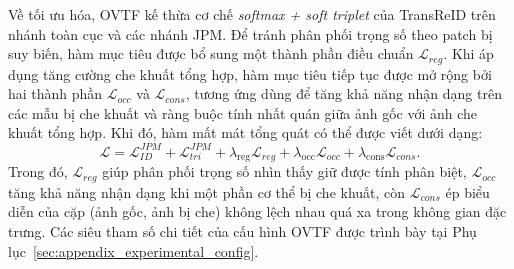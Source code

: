 Về tối ưu hóa, OVTF kế thừa cơ chế \textit{softmax + soft triplet} của
TransReID trên nhánh toàn cục và các nhánh JPM. Để tránh phân phối trọng số
theo patch bị suy biến, hàm mục tiêu được bổ sung một thành phần điều chuẩn
\(\mathcal{L}_{reg}\). Khi áp dụng tăng cường che khuất tổng hợp, hàm mục tiêu
tiếp tục được mở rộng bởi hai thành phần \(\mathcal{L}_{occ}\) và
\(\mathcal{L}_{cons}\), tương ứng dùng để tăng khả năng nhận dạng trên các mẫu
bị che khuất và ràng buộc tính nhất quán giữa ảnh gốc với ảnh che khuất tổng
hợp. Khi đó, hàm mất mát tổng quát có thể được viết dưới dạng:
\[
\mathcal{L}
= \mathcal{L}_{ID}^{JPM}
+ \mathcal{L}_{tri}^{JPM}
+ \lambda_{\mathrm{reg}}\mathcal{L}_{reg}
+ \lambda_{\mathrm{occ}}\mathcal{L}_{occ}
+ \lambda_{\mathrm{cons}}\mathcal{L}_{cons}.
\]
Trong đó, \(\mathcal{L}_{reg}\) giúp phân phối trọng số nhìn thấy giữ được tính
phân biệt, \(\mathcal{L}_{occ}\) tăng khả năng nhận dạng khi một phần cơ thể bị
che khuất, còn \(\mathcal{L}_{cons}\) ép biểu diễn của cặp (ảnh gốc, ảnh bị
che) không lệch nhau quá xa trong không gian đặc trưng. Các siêu tham
số chi tiết của cấu hình OVTF được trình bày tại
Phụ lục~\ref{sec:appendix_experimental_config}.
